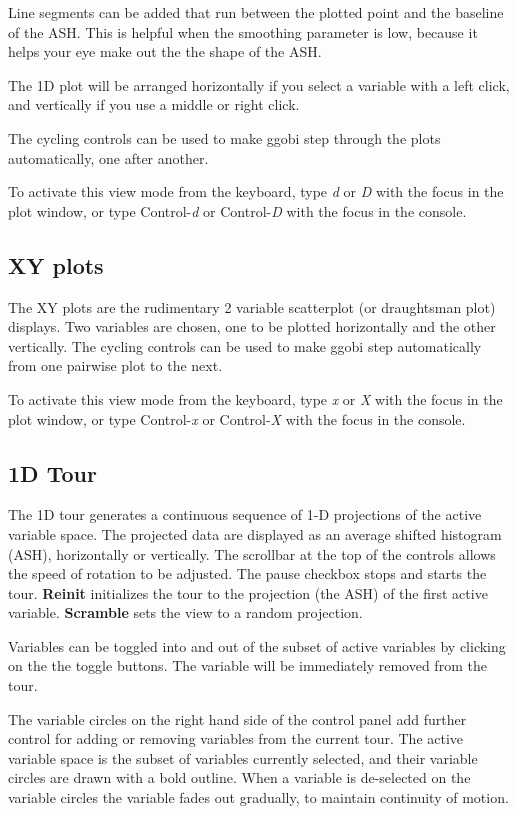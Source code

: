 \documentclass[11pt]{article}
\begin{document}
Line segments can be added that run between the plotted point and the
baseline of the ASH.  This is helpful when the smoothing parameter is low,
because it helps your eye make out the the shape of the ASH.

The 1D plot will be arranged horizontally if you select a variable
with a left click, and vertically if you use a middle or right click.

The cycling controls can be used to make ggobi step through the
plots automatically, one after another.

To activate this view mode from the keyboard, type {\em d} or {\em D}
with the focus in the plot window, or type Control-{\em d} or
Control-{\em D} with the focus in the console.

\subsection{XY plots}

The XY plots are the rudimentary 2 variable scatterplot (or draughtsman
plot) displays. Two variables are chosen, one to be plotted horizontally
and the other vertically. The cycling controls can be used to make ggobi
step automatically from one pairwise plot to the next.

To activate this view mode from the keyboard, type {\em x} or {\em X}
with the focus in the plot window, or type Control-{\em x} or
Control-{\em X} with the focus in the console.

\subsection{1D Tour}
\label{slbl:1DTour}

The 1D tour generates a continuous sequence of 1-D projections of the
active variable space. The projected data are displayed as an average
shifted histogram (ASH), horizontally or vertically. The scrollbar at the
top of the controls allows the speed of rotation to be adjusted. The
pause checkbox stops and starts the tour. {\bf Reinit} initializes the tour
to the projection (the ASH) of the first active variable.  {\bf Scramble} sets
the view to a random projection.

Variables can be toggled into and out of the subset of active
variables by clicking on the the toggle buttons. The variable will be
immediately removed from the tour. 

The variable circles on the right hand side of the control panel add
further control for adding or removing variables from the current
tour. The active variable space is the subset of variables currently
selected, and their variable circles are drawn with a bold
outline. When a variable is de-selected on the variable circles the
variable fades out gradually, to maintain continuity of motion.
\end{document}
